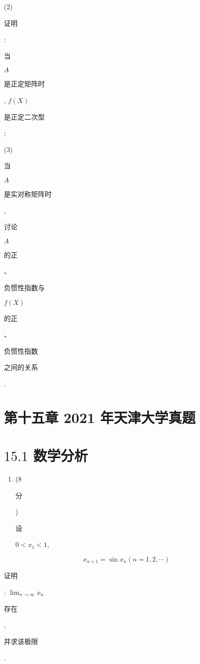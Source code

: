 \documentclass[10pt]{article}
\begin{document}
(2) \begin{CJK}{UTF8}{mj}证明\end{CJK}: \begin{CJK}{UTF8}{mj}当\end{CJK} $A$ \begin{CJK}{UTF8}{mj}是正定矩阵时\end{CJK}, $f(X)$ \begin{CJK}{UTF8}{mj}是正定二次型\end{CJK};

(3) \begin{CJK}{UTF8}{mj}当\end{CJK} $A$ \begin{CJK}{UTF8}{mj}是实对称矩阵时\end{CJK}, \begin{CJK}{UTF8}{mj}讨论\end{CJK} $A$ \begin{CJK}{UTF8}{mj}的正\end{CJK}、\begin{CJK}{UTF8}{mj}负惯性指数与\end{CJK} $f(X)$ \begin{CJK}{UTF8}{mj}的正\end{CJK}、\begin{CJK}{UTF8}{mj}负惯性指数\end{CJK} \begin{CJK}{UTF8}{mj}之间的关系\end{CJK}.

\section{第十五章 2021 年天津大学真题}
\section{$15.1$ 数学分析}
\begin{enumerate}
  \item (8 \begin{CJK}{UTF8}{mj}分\end{CJK}) \begin{CJK}{UTF8}{mj}设\end{CJK} $0<x_{1}<1$,
\end{enumerate}
$$
x_{n+1}=\sin x_{n}(n=1,2, \cdots)
$$
\begin{CJK}{UTF8}{mj}证明\end{CJK}: $\lim _{n \rightarrow \infty} x_{n}$ \begin{CJK}{UTF8}{mj}存在\end{CJK}, \begin{CJK}{UTF8}{mj}并求该极限\end{CJK}.
\end{document}
